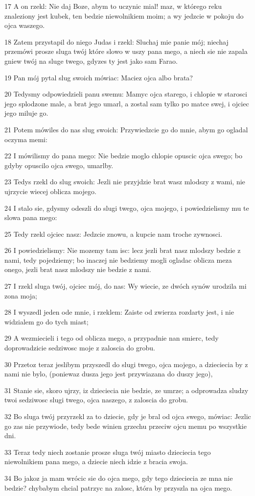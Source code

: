 \par 17 A on rzekl: Nie daj Boze, abym to uczynic mial! maz, w którego reku znaleziony jest kubek, ten bedzie niewolnikiem moim; a wy jedzcie w pokoju do ojca waszego.
\par 18 Zatem przystapil do niego Judas i rzekl: Sluchaj mie panie mój; niechaj przemówi prosze sluga twój które slowo w uszy pana mego, a niech sie nie zapala gniew twój na sluge twego, gdyzes ty jest jako sam Farao.
\par 19 Pan mój pytal slug swoich mówiac: Maciez ojca albo brata?
\par 20 Tedysmy odpowiedzieli panu swemu: Mamyc ojca starego, i chlopie w starosci jego splodzone male, a brat jego umarl, a zostal sam tylko po matce swej, i ojciec jego miluje go.
\par 21 Potem mówiles do nas slug swoich: Przywiedzcie go do mnie, abym go ogladal oczyma memi:
\par 22 I mówilismy do pana mego: Nie bedzie moglo chlopie opuscic ojca swego; bo gdyby opuscilo ojca swego, umarlby.
\par 23 Tedys rzekl do slug swoich: Jezli nie przyjdzie brat wasz mlodszy z wami, nie ujrzycie wiecej oblicza mojego.
\par 24 I stalo sie, gdysmy odeszli do slugi twego, ojca mojego, i powiedzielismy mu te slowa pana mego:
\par 25 Tedy rzekl ojciec nasz: Jedzcie znowu, a kupcie nam troche zywnosci.
\par 26 I powiedzielismy: Nie mozemy tam isc: lecz jezli brat nasz mlodszy bedzie z nami, tedy pojedziemy; bo inaczej nie bedziemy mogli ogladac oblicza meza onego, jezli brat nasz mlodszy nie bedzie z nami.
\par 27 I rzekl sluga twój, ojciec mój, do nas: Wy wiecie, ze dwóch synów urodzila mi zona moja;
\par 28 I wyszedl jeden ode mnie, i rzeklem: Zaiste od zwierza rozdarty jest, i nie widzialem go do tych miast;
\par 29 A wezmiecieli i tego od oblicza mego, a przypadnie nan smierc, tedy doprowadzicie sedziwosc moje z zaloscia do grobu.
\par 30 Przetoz teraz jeslibym przyszedl do slugi twego, ojca mojego, a dzieciecia by z nami nie bylo, (poniewaz dusza jego jest przywiazana do duszy jego),
\par 31 Stanie sie, skoro ujrzy, iz dzieciecia nie bedzie, ze umrze; a odprowadza sludzy twoi sedziwosc slugi twego, ojca naszego, z zaloscia do grobu.
\par 32 Bo sluga twój przyrzekl za to dziecie, gdy je bral od ojca swego, mówiac: Jezlic go zas nie przywiode, tedy bede winien grzechu przeciw ojcu memu po wszystkie dni.
\par 33 Teraz tedy niech zostanie prosze sluga twój miasto dzieciecia tego niewolnikiem pana mego, a dziecie niech idzie z bracia swoja.
\par 34 Bo jakoz ja mam wrócic sie do ojca mego, gdy tego dzieciecia ze mna nie bedzie? chybabym chcial patrzyc na zalosc, która by przyszla na ojca mego.

